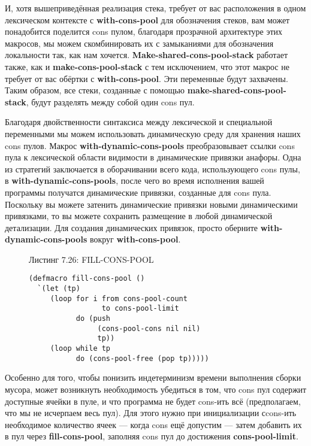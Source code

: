 И, хотя вышеприведённая реализация стека, требует от вас расположения в одном лексическом контексте с \textbf{with-cons-pool} для обозначения стеков, вам может понадобится поделится cons пулом, благодаря прозрачной архитектуре этих макросов, мы можем скомбинировать их с замыканиями для обозначения локальности так, как нам хочется. \textbf{Make-shared-cons-pool-stack} работает также, как и \textbf{make-cons-pool-stack} с тем исключением, что этот макрос не требует от вас обёртки с \textbf{with-cons-pool}. Эти переменные будут захвачены. Таким образом, все стеки, созданные с помощью \textbf{make-shared-cons-pool-stack}, будут разделять между собой один cons пул.

Благодаря двойственности синтаксиса между лексической и специальной переменными мы можем использовать динамическую среду для хранения наших cons пулов. Макрос \textbf{with-dynamic-cons-pools} преобразовывает ссылки cons пула к лексической области видимости в динамические привязки анафоры. Одна из стратегий заключается в оборачивании всего кода, использующего cons пулы, в \textbf{with-dynamic-cons-pools}, после чего во время исполнения вашей программы получатся динамические привязки, созданные для cons пула. Поскольку вы можете затенить динамические привязки новыми динамическими привязками, то вы можете сохранить размещение в любой динамической детализации. Для создания динамических привязок, просто оберните \textbf{with-dynamic-cons-pools} вокруг \textbf{with-cons-pool}.

\begin{figure}Листинг 7.26: FILL-CONS-POOL\label{listing_7.26}
\listbegin
\begin{verbatim}
(defmacro fill-cons-pool ()
  `(let (tp)
     (loop for i from cons-pool-count
                 to cons-pool-limit
           do (push
                (cons-pool-cons nil nil)
                tp))
     (loop while tp
           do (cons-pool-free (pop tp)))))
\end{verbatim}
\listend
\end{figure}

Особенно для того, чтобы понизить индетерминизм времени выполнения сборки мусора, может возникнуть необходимость убедиться в том, что cons пул содержит доступные ячейки в пуле, и что программа не будет cons-ить всё (предполагаем, что мы не исчерпаем весь пул). Для этого нужно при инициализации сcons-ить необходимое количество ячеек --- когда cons ещё допустим --- затем добавить их в пул через \textbf{fill-cons-pool}, заполняя cons пул до достижения \textbf{cons-pool-limit}.

